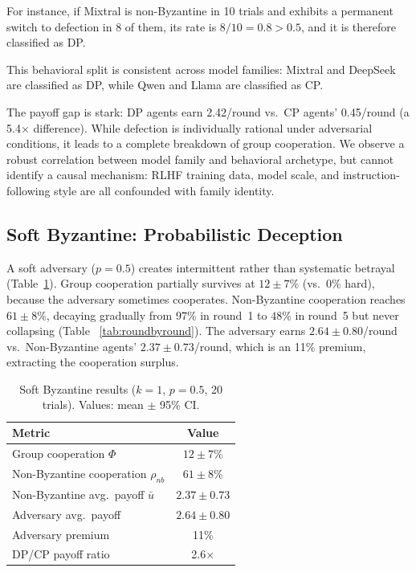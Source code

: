 \documentclass[runningheads]{llncs}
\begin{document}
For instance, if Mixtral is non-Byzantine in 10 trials and exhibits a permanent switch to defection in 8 of them, its rate is $8/10 = 0.8 > 0.5$, and it is therefore classified as DP.

This behavioral split is consistent across model families: Mixtral and DeepSeek are classified as DP, while Qwen and Llama are classified as CP.


The payoff gap is stark: DP agents earn 2.42/round vs.\ CP agents' 0.45/round (a 5.4$\times$ difference). While defection is individually rational under adversarial conditions, it leads to a complete breakdown of group cooperation.
We observe a robust correlation between model family and behavioral archetype, but cannot identify a causal mechanism: RLHF training data, model scale, and instruction-following style are all confounded with family identity.


\subsection{Soft Byzantine: Probabilistic Deception}\label{sec:byz-soft}

A soft adversary ($p{=}0.5$) creates intermittent rather than systematic betrayal (Table~\ref{tab:soft}).
Group cooperation partially survives at $12{\pm}7$\% (vs.\ 0\% hard), because the adversary sometimes cooperates.
Non-Byzantine cooperation reaches $61{\pm}8$\%, decaying gradually from $97\%$ in round~1 to $48$\% in round~5 but never collapsing (Table ~\ref{tab:roundbyround}).  
The adversary earns $2.64{\pm}0.80$/round vs.\ Non-Byzantine agents' $2.37{\pm}0.73$/round, which is an 11\% premium, extracting the cooperation surplus.

\begin{table}[h]
\centering
\caption{Soft Byzantine results ($k{=}1$, $p{=}0.5$, 20 trials). Values: mean $\pm$ 95\% CI.}\label{tab:soft}
\smallskip
\footnotesize
\begin{tabular}{@{}lc@{}}
\toprule
Metric & Value \\
\midrule
Group cooperation $\Phi$ & $12{\pm}7$\% \\
Non-Byzantine cooperation $\rho_{nb}$ & $61{\pm}8$\% \\
Non-Byzantine avg.\ payoff $\bar{u}$ & $2.37{\pm}0.73$ \\
Adversary avg.\ payoff & $2.64{\pm}0.80$ \\
Adversary premium & 11\% \\
DP/CP payoff ratio & 2.6$\times$ \\
\bottomrule
\end{tabular}
\end{table}
\end{document}
